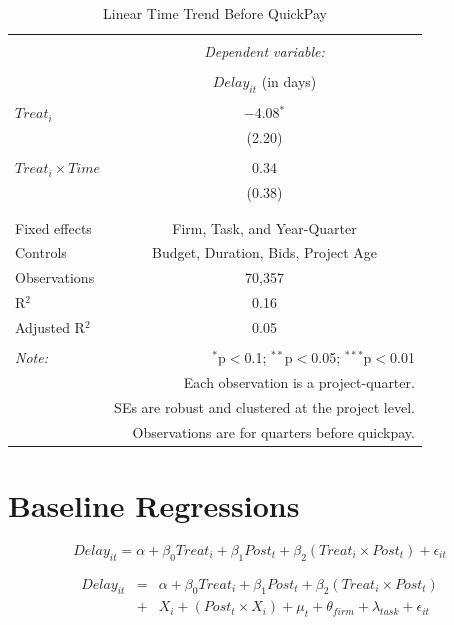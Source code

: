 \documentclass[]{article}
\begin{document}
\begin{table}[H] \centering 
  \caption{Linear Time Trend Before QuickPay} 
  \label{} 
\small 
\begin{tabular}{@{\extracolsep{5pt}}lc} 
\\[-1.8ex]\hline 
\hline \\[-1.8ex] 
 & \multicolumn{1}{c}{\textit{Dependent variable:}} \\ 
\cline{2-2} 
\\[-1.8ex] & $Delay_{it}$ (in days) \\ 
\hline \\[-1.8ex] 
 $Treat_i$ & $-$4.08$^{*}$ \\ 
  & (2.20) \\ 
  & \\ 
 $Treat_i \times Time$ & 0.34 \\ 
  & (0.38) \\ 
  & \\ 
\hline \\[-1.8ex] 
Fixed effects & Firm, Task, and Year-Quarter \\ 
Controls & Budget, Duration, Bids, Project Age \\ 
Observations & 70,357 \\ 
R$^{2}$ & 0.16 \\ 
Adjusted R$^{2}$ & 0.05 \\ 
\hline 
\hline \\[-1.8ex] 
\textit{Note:}  & \multicolumn{1}{r}{$^{*}$p$<$0.1; $^{**}$p$<$0.05; $^{***}$p$<$0.01} \\ 
 & \multicolumn{1}{r}{Each observation is a project-quarter.} \\ 
 & \multicolumn{1}{r}{SEs are robust and clustered at the project level.} \\ 
 & \multicolumn{1}{r}{Observations are for quarters before quickpay.} \\ 
\end{tabular} 
\end{table}

\hypertarget{baseline-regressions}{%
\section{Baseline Regressions}\label{baseline-regressions}}

\[ Delay_{it} = \alpha+\beta_0 Treat_i + \beta_1 Post_t + \beta_2 (Treat_i \times Post_t) + \epsilon_{it}\]

\[ \begin{aligned} Delay_{it} &=& \alpha+\beta_0 Treat_i + \beta_1 Post_t + \beta_2 (Treat_i \times Post_t)\\
&+&  X_i + (Post_t \times X_i) + \mu_t + \theta_{firm} + \lambda_{task}+ \epsilon_{it}
\end{aligned}\]
\end{document}
